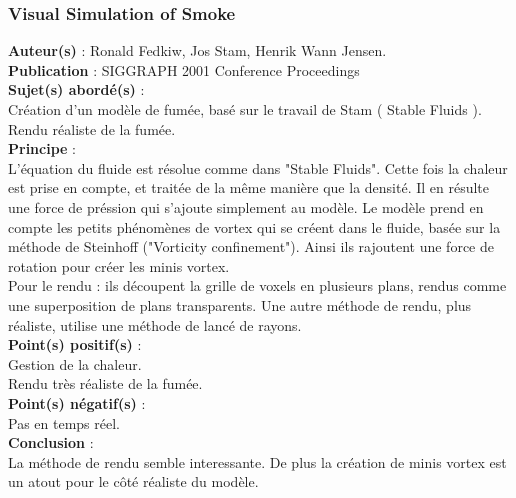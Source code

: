 \documentclass[a4paper,10pt]{article}
\begin{document}
\subsubsection{Visual Simulation of Smoke}
\textbf{Auteur(s)} : Ronald Fedkiw, Jos Stam, Henrik Wann Jensen.\\
\textbf{Publication} : SIGGRAPH 2001 Conference Proceedings \\
\textbf{Sujet(s) abordé(s)} : \\
	Création d'un modèle de fumée, basé sur le travail de Stam ( Stable Fluids ).\\
	Rendu réaliste de la fumée.\\
\textbf{Principe} :\\	
	L'équation du fluide est résolue comme dans "Stable Fluids". Cette fois la chaleur est prise en compte, et traitée de la même manière que la densité. Il en résulte une force de préssion qui s'ajoute simplement au modèle. Le modèle prend en compte les petits phénomènes de vortex qui se créent dans le fluide, basée sur la méthode de Steinhoff ("Vorticity confinement"). Ainsi ils rajoutent une force de rotation pour créer les minis vortex.\\
Pour le rendu : ils découpent la grille de voxels en plusieurs plans, rendus comme une superposition de plans transparents.
Une autre méthode de rendu, plus réaliste, utilise une méthode de lancé de rayons.\\
\textbf{Point(s) positif(s)} :\\
	Gestion de la chaleur.\\
	Rendu très réaliste de la fumée.\\
\textbf{Point(s) négatif(s)} :\\
	Pas en temps réel.\\
\textbf{Conclusion} :\\
	La méthode de rendu semble interessante. De plus la création de minis vortex est un atout pour le côté réaliste du modèle.
	
\end{document}
